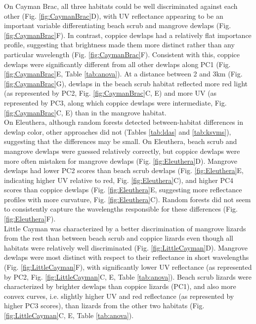 On Cayman Brac, all three habitats could be well discriminated against each other (Fig. \ref{fig:CaymanBrac}D), with UV reflectance appearing to be an important variable differentiating beach scrub and mangrove dewlaps (Fig. \ref{fig:CaymanBrac}F). In contrast, coppice dewlaps had a relatively flat importance profile, suggesting that brightness made them more distinct rather than any particular wavelength (Fig. \ref{fig:CaymanBrac}F). Consistent with this, coppice dewlaps were significantly different from all other dewlaps along PC1 (Fig. \ref{fig:CaymanBrac}E, Table \ref{tab:anova}). At a distance between 2 and 3km (Fig. \ref{fig:CaymanBrac}G), dewlaps in the beach scrub habitat reflected more red light (as represented by PC2, Fig. \ref{fig:CaymanBrac}C, E) and more UV (as represented by PC3, along which coppice dewlaps were intermediate, Fig. \ref{fig:CaymanBrac}C, E) than in the mangrove habitat.\\

On Eleuthera, although random forests detected between-habitat differences in dewlap color, other approaches did not (Tables \ref{tab:ldas} and \ref{tab:ksvms}), suggesting that the differences may be small. On Eleuthera, beach scrub and mangrove dewlaps were guessed relatively correctly, but coppice dewlaps were more often mistaken for mangrove dewlaps (Fig. \ref{fig:Eleuthera}D). Mangrove dewlaps had lower PC2 scores than beach scrub dewlaps (Fig. \ref{fig:Eleuthera}E, indicating higher UV relative to red, Fig. \ref{fig:Eleuthera}C), and higher PC4 scores than coppice dewlaps (Fig. \ref{fig:Eleuthera}E, suggesting more reflectance profiles with more curvature, Fig. \ref{fig:Eleuthera}C). Random forests did not seem to consistently capture the wavelengths responsible for these differences (Fig. \ref{fig:Eleuthera}F).\\

Little Cayman was characterized by a better discrimination of mangrove lizards from the rest than between beach scrub and coppice lizards even though all habitats were relatively well discriminated (Fig. \ref{fig:LittleCayman}D). Mangrove dewlaps were most distinct with respect to their reflectance in short wavelengths (Fig. \ref{fig:LittleCayman}F), with significantly lower UV reflectance (as represented by PC2, Fig. \ref{fig:LittleCayman}C, E, Table \ref{tab:anova}). Beach scrub lizards were characterized by brighter dewlaps than coppice lizards (PC1), and also more convex curves, i.e. slightly higher UV and red reflectance (as represented by higher PC3 scores), than lizards from the other two habitats (Fig. \ref{fig:LittleCayman}C, E, Table \ref{tab:anova}).\\

